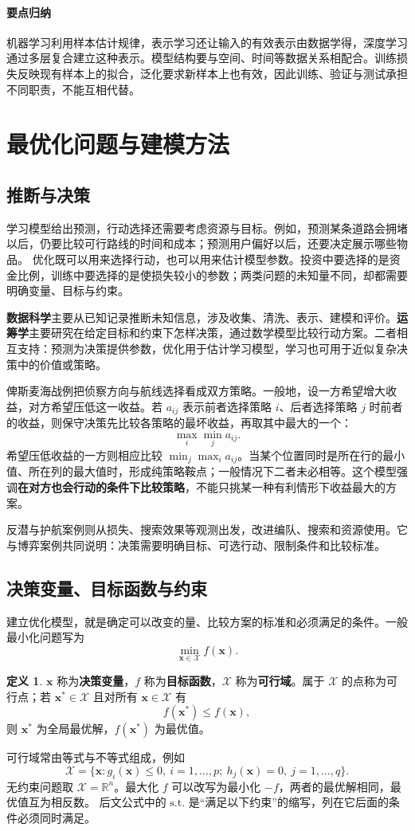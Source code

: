 \documentclass[UTF8,fontset=fandol,a4paper,12pt]{ctexart}
\newcommand{\R}{\mathbb R}
\newcommand{\vx}{\boldsymbol x}
\theoremstyle{definition}
\newtheorem{definition}{定义}[section]
\begin{document}
\paragraph{要点归纳}
机器学习利用样本估计规律，表示学习还让输入的有效表示由数据学得，深度学习通过多层复合建立这种表示。模型结构要与空间、时间等数据关系相配合。训练损失反映现有样本上的拟合，泛化要求新样本上也有效，因此训练、验证与测试承担不同职责，不能互相代替。

\section{最优化问题与建模方法}\label{sec:model}
\subsection{推断与决策}
学习模型给出预测，行动选择还需要考虑资源与目标。例如，预测某条道路会拥堵以后，仍要比较可行路线的时间和成本；预测用户偏好以后，还要决定展示哪些物品。
优化既可以用来选择行动，也可以用来估计模型参数。投资中要选择的是资金比例，训练中要选择的是使损失较小的参数；两类问题的未知量不同，却都需要明确变量、目标与约束。

\textbf{数据科学}主要从已知记录推断未知信息，涉及收集、清洗、表示、建模和评价。\textbf{运筹学}主要研究在给定目标和约束下怎样决策，通过数学模型比较行动方案。二者相互支持：预测为决策提供参数，优化用于估计学习模型，学习也可用于近似复杂决策中的价值或策略。

俾斯麦海战例把侦察方向与航线选择看成双方策略。一般地，设一方希望增大收益，对方希望压低这一收益。若 $a_{ij}$ 表示前者选择策略 $i$、后者选择策略 $j$ 时前者的收益，则保守决策先比较各策略的最坏收益，再取其中最大的一个：
\[
 \max_i\min_j a_{ij}.
\]
希望压低收益的一方则相应比较 $\min_j\max_i a_{ij}$。当某个位置同时是所在行的最小值、所在列的最大值时，形成纯策略鞍点；一般情况下二者未必相等。这个模型强调\textbf{在对方也会行动的条件下比较策略}，不能只挑某一种有利情形下收益最大的方案。

反潜与护航案例则从损失、搜索效果等观测出发，改进编队、搜索和资源使用。它与博弈案例共同说明：决策需要明确目标、可选行动、限制条件和比较标准。

\subsection{决策变量、目标函数与约束}
建立优化模型，就是确定可以改变的量、比较方案的标准和必须满足的条件。一般最小化问题写为
\begin{equation}\label{eq:optimization}
 \boxed{\min_{\vx\in\mathcal X} f(\vx).}
\end{equation}
\begin{definition}
$\vx$ 称为\textbf{决策变量}，$f$ 称为\textbf{目标函数}，$\mathcal X$ 称为\textbf{可行域}。属于 $\mathcal X$ 的点称为可行点；若 $\vx^*\in\mathcal X$ 且对所有 $\vx\in\mathcal X$ 有
\[
 f(\vx^*)\le f(\vx),
\]
则 $\vx^*$ 为全局最优解，$f(\vx^*)$ 为最优值。
\end{definition}
可行域常由等式与不等式组成，例如
\[
 \mathcal X=\{\vx:g_i(\vx)\le0,\ i=1,\ldots,p;
 \ h_j(\vx)=0,\ j=1,\ldots,q\}.
\]
无约束问题取 $\mathcal X=\R^n$。最大化 $f$ 可以改写为最小化 $-f$，两者的最优解相同，最优值互为相反数。
后文公式中的 $\text{s.t.}$ 是“满足以下约束”的缩写，列在它后面的条件必须同时满足。
\end{document}
